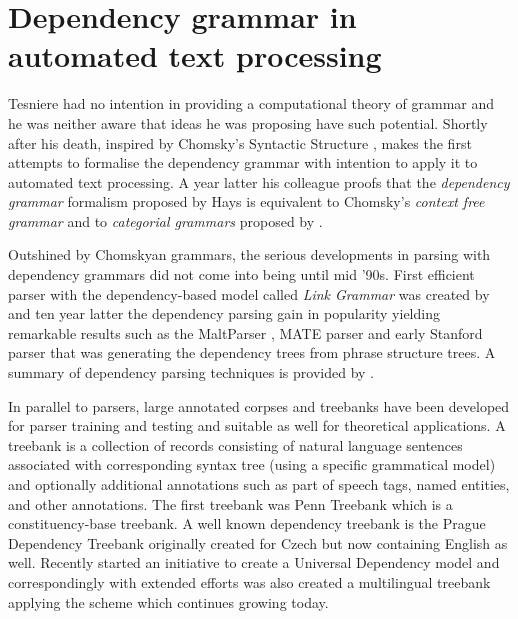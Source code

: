 \section{Dependency grammar in automated text processing}
Tesniere had no intention in providing a computational theory of grammar and he was neither aware that ideas he was proposing have such potential. Shortly after his death, inspired by Chomsky's Syntactic Structure \citep{Chomsky57}, \citet{Hays1960,Hays1964} makes the first attempts to formalise the dependency grammar with intention to apply it to automated text processing. A year latter his colleague \citet{Gaifman1965} proofs that the \textit{dependency grammar} formalism proposed by Hays is equivalent to Chomsky's \textit{context free grammar} and to \textit{categorial grammars} proposed by \citet{BarHillel53}.

Outshined by Chomskyan grammars, the serious developments in parsing with dependency grammars did not come into being until mid '90s. First efficient parser with the dependency-based model called \textit{Link Grammar} was created by \citet{sleator1995parsing} and ten year latter the dependency parsing gain in popularity yielding remarkable results such as the MaltParser \citep{Nivre2006,Nivre2007parser}, MATE parser \citep{Bohnet2010} and early Stanford parser \citep{Marneffe2006} that was generating the dependency trees from phrase structure trees. A summary of dependency parsing techniques is provided by \citet{kubler2009dependency}.

In parallel to parsers, large annotated corpses and treebanks have been developed for parser training and testing and suitable as well for theoretical applications. A treebank is a collection of records consisting of natural language sentences associated with corresponding syntax tree (using a specific grammatical model) and optionally additional annotations such as part of speech tags, named entities, and other annotations. The first treebank was Penn Treebank \citep{Santorini1990,Marcus1993} which is a constituency-base treebank. A well known dependency treebank is the Prague Dependency Treebank \citep{hajic2001prague,Bohmova2003} originally created for Czech but now containing English as well. Recently started an initiative to create a Universal Dependency model \citep{nivre2015} and correspondingly with extended efforts was also created a multilingual treebank applying the scheme \citep{Nivre2016ud} which continues growing today.


